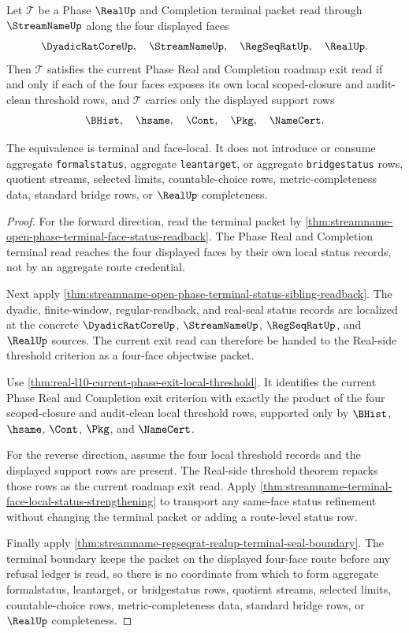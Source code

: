 \begin{theorem}
\label{thm:streamname-open-phase-terminal-local-threshold-equivalence}
Let $\mathcal T$ be a Phase $\RealUp$ and Completion terminal packet read through $\StreamNameUp$ along the four displayed faces
$$
\DyadicRatCoreUp,\quad \StreamNameUp,\quad \RegSeqRatUp,\quad \RealUp.
$$
Then $\mathcal T$ satisfies the current Phase Real and Completion roadmap exit read if and only if each of the four faces exposes its own local scoped-closure and audit-clean threshold rows, and $\mathcal T$ carries only the displayed support rows
$$
\BHist,\quad \hsame,\quad \Cont,\quad \Pkg,\quad \NameCert.
$$

The equivalence is terminal and face-local. It does not introduce or consume aggregate \texttt{formalstatus}, aggregate \texttt{leantarget}, or aggregate \texttt{bridgestatus} rows, quotient streams, selected limits, countable-choice rows, metric-completeness data, standard bridge rows, or $\RealUp$ completeness.
\end{theorem}
\begin{proof}
For the forward direction, read the terminal packet by \autoref{thm:streamname-open-phase-terminal-face-status-readback}. The Phase Real and Completion terminal read reaches the four displayed faces by their own local status records, not by an aggregate route credential.

Next apply \autoref{thm:streamname-open-phase-terminal-status-sibling-readback}. The dyadic, finite-window, regular-readback, and real-seal status records are localized at the concrete $\DyadicRatCoreUp$, $\StreamNameUp$, $\RegSeqRatUp$, and $\RealUp$ sources. The current exit read can therefore be handed to the Real-side threshold criterion as a four-face objectwise packet.

Use \autoref{thm:real-l10-current-phase-exit-local-threshold}. It identifies the current Phase Real and Completion exit criterion with exactly the product of the four scoped-closure and audit-clean local threshold rows, supported only by $\BHist$, $\hsame$, $\Cont$, $\Pkg$, and $\NameCert$.

For the reverse direction, assume the four local threshold records and the displayed support rows are present. The Real-side threshold theorem repacks those rows as the current roadmap exit read. Apply \autoref{thm:streamname-terminal-face-local-status-strengthening} to transport any same-face status refinement without changing the terminal packet or adding a route-level status row.

Finally apply \autoref{thm:streamname-regseqrat-realup-terminal-seal-boundary}. The terminal boundary keeps the packet on the displayed four-face route before any refusal ledger is read, so there is no coordinate from which to form aggregate formalstatus, leantarget, or bridgestatus rows, quotient streams, selected limits, countable-choice rows, metric-completeness data, standard bridge rows, or $\RealUp$ completeness.
\end{proof}

